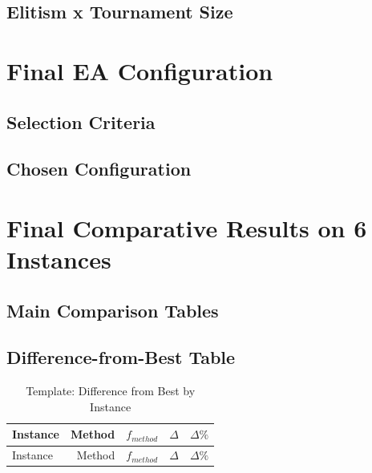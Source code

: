 \documentclass[12pt,a4paper]{report}
\begin{document}
\section{Elitism x Tournament Size}

\chapter{Final EA Configuration}
\section{Selection Criteria}

\section{Chosen Configuration}

\chapter{Final Comparative Results on 6 Instances}
\section{Main Comparison Tables}

\section{Difference-from-Best Table}

\begin{longtable}{lrrrr}
\caption{Template: Difference from Best by Instance}\label{tab:diff_from_best}\\
\toprule
Instance & Method & $f_{method}$ & $\Delta$ & $\Delta\%$ \\
\midrule
\endfirsthead
\toprule
Instance & Method & $f_{method}$ & $\Delta$ & $\Delta\%$ \\
\midrule
\endhead
\bottomrule
\end{longtable}
\end{document}
